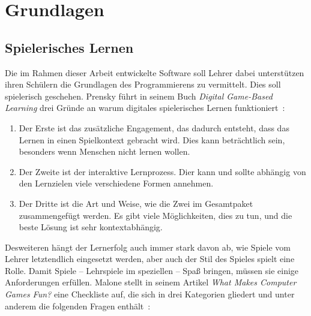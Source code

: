 \chapter{Grundlagen}
\label{sec:basics}

\section{Spielerisches Lernen}
\label{sec:basics:playful-learning}

Die im Rahmen dieser Arbeit entwickelte Software soll Lehrer dabei unterstützen ihren Schülern die Grundlagen des Programmierens zu vermittelt. Dies soll spielerisch geschehen. Prensky führt in seinem Buch \textit{Digital Game-Based Learning} drei Gründe an warum digitales spielerisches Lernen funktioniert~\cite[147]{prensky2007}:

\begin{enumerate}
    \item Der Erste ist das zusätzliche Engagement, das dadurch entsteht, dass das Lernen in einen Spielkontext gebracht wird. Dies kann beträchtlich sein, besonders wenn Menschen nicht lernen wollen.
    \item Der Zweite ist der interaktive Lernprozess. Dier kann und sollte abhängig von den Lernzielen viele verschiedene Formen annehmen.
    \item Der Dritte ist die Art und Weise, wie die Zwei im Gesamtpaket zusammengefügt werden. Es gibt viele Möglichkeiten, dies zu tun, und die beste Lösung ist sehr kontextabhängig.
\end{enumerate}

Desweiteren hängt der Lernerfolg auch immer stark davon ab, wie Spiele vom Lehrer letztendlich eingesetzt werden, aber auch der Stil des Spieles spielt eine Rolle. Damit Spiele -- Lehrspiele im speziellen -- Spaß bringen, müssen sie einige Anforderungen erfüllen. Malone stellt in seinem Artikel \textit{What Makes Computer Games Fun?} eine Checkliste auf, die sich in drei Kategorien gliedert und unter anderem die folgenden Fragen enthält~\cite[49]{malone1981}:

